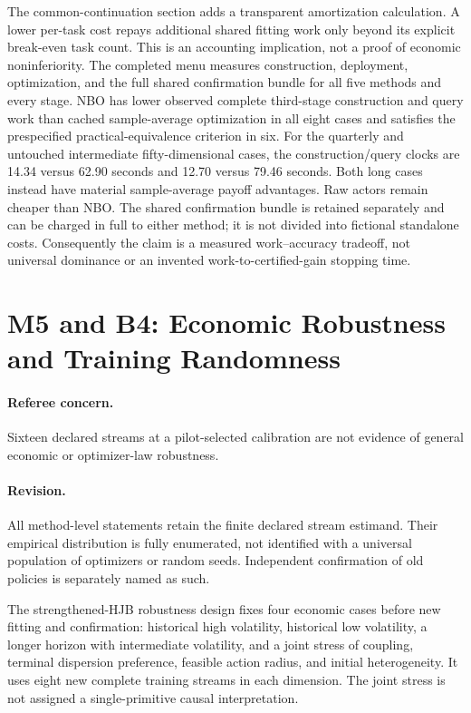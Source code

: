 The common-continuation section adds a transparent amortization calculation. A lower per-task cost repays additional shared fitting work only beyond its explicit break-even task count. This is an accounting implication, not a proof of economic noninferiority. The completed menu measures construction, deployment, optimization, and the full shared confirmation bundle for all five methods and every stage. NBO has lower observed complete third-stage construction and query work than cached sample-average optimization in all eight cases and satisfies the prespecified practical-equivalence criterion in six. For the quarterly and untouched intermediate fifty-dimensional cases, the construction/query clocks are 14.34 versus 62.90 seconds and 12.70 versus 79.46 seconds. Both long cases instead have material sample-average payoff advantages. Raw actors remain cheaper than NBO. The shared confirmation bundle is retained separately and can be charged in full to either method; it is not divided into fictional standalone costs. Consequently the claim is a measured work--accuracy tradeoff, not universal dominance or an invented work-to-certified-gain stopping time.

\section{M5 and B4: Economic Robustness and Training Randomness}
\paragraph*{Referee concern.} Sixteen declared streams at a pilot-selected calibration are not evidence of general economic or optimizer-law robustness.

\paragraph*{Revision.} All method-level statements retain the finite declared stream estimand. Their empirical distribution is fully enumerated, not identified with a universal population of optimizers or random seeds. Independent confirmation of old policies is separately named as such.

The strengthened-HJB robustness design fixes four economic cases before new fitting and confirmation: historical high volatility, historical low volatility, a longer horizon with intermediate volatility, and a joint stress of coupling, terminal dispersion preference, feasible action radius, and initial heterogeneity. It uses eight new complete training streams in each dimension. The joint stress is not assigned a single-primitive causal interpretation.

